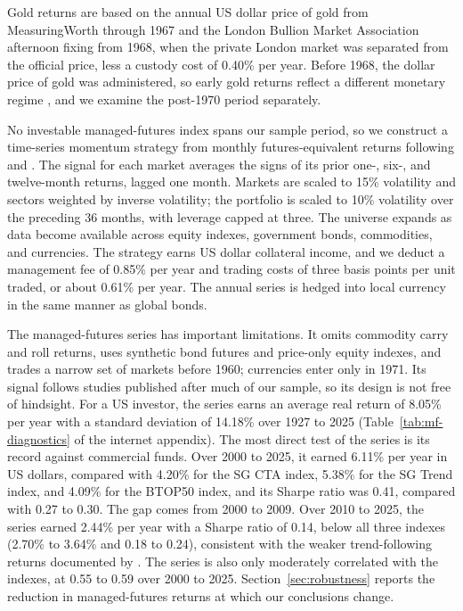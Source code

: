 \documentclass[12pt]{article}
\begin{document}
Gold returns are based on the annual US dollar price of gold from MeasuringWorth
\citep{OfficerWilliamsonMeasuringWorth} through 1967 and the London Bullion Market Association afternoon
fixing \citep{LBMA} from 1968, when the private London market was separated from the official price,
less a custody cost of 0.40\% per year. Before 1968, the dollar price of gold
was administered, so early gold returns reflect a different monetary regime \citep{ErbHarvey2013}, and we
examine the post-1970 period separately.

No investable managed-futures index spans our sample period, so we construct a time-series momentum
strategy from monthly futures-equivalent returns following \citet{MoskowitzOoiPedersen2012} and
\citet{HurstOoiPedersen2017}. The signal for each market averages the signs of its prior one-, six-, and
twelve-month returns, lagged one month. Markets are scaled to 15\% volatility and sectors weighted by
inverse volatility; the portfolio is scaled to 10\% volatility over the preceding 36 months, with leverage
capped at three. The universe expands as data become available across
equity indexes, government bonds, commodities, and currencies. The strategy earns US dollar collateral
income, and we deduct a management fee of 0.85\% per year and trading costs of three basis points per
unit traded, or about 0.61\% per year. The annual series is hedged into local currency in the same manner
as global bonds.

The managed-futures series has important limitations. It omits commodity carry and roll returns, uses
synthetic bond futures and price-only equity indexes, and trades a narrow set of markets before 1960;
currencies enter only in 1971. Its signal follows studies published after much of our sample, so its
design is not free of hindsight. For a US investor, the series earns an average real return of 8.05\% per
year with a standard deviation of 14.18\% over 1927 to 2025 (Table~\ref{tab:mf-diagnostics} of the
internet appendix). The most direct test of the series is its record against commercial funds. Over 2000
to 2025, it earned 6.11\% per year in US dollars, compared with 4.20\% for the SG CTA index, 5.38\% for the
SG Trend index, and 4.09\% for the BTOP50 index, and its Sharpe ratio was 0.41, compared with 0.27 to 0.30.
The gap comes from 2000 to 2009. Over 2010 to 2025, the series earned 2.44\% per year with a Sharpe ratio
of 0.14, below all three indexes (2.70\% to 3.64\% and 0.18 to 0.24), consistent with the weaker
trend-following returns documented by \citet{BabuEtAl2020}. The series is also only moderately
correlated with the indexes, at 0.55 to 0.59 over 2000 to 2025. Section~\ref{sec:robustness} reports the
reduction in managed-futures returns at which our conclusions change.
\end{document}
